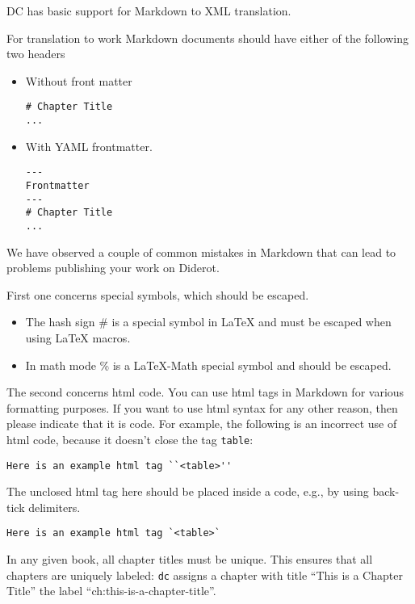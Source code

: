 DC has basic support for Markdown to XML translation.  

\begin{gram}[Header]
For translation to work Markdown documents should have either of the following two headers
\begin{itemize}
\item Without front matter
\begin{lstlisting}
# Chapter Title
...
\end{lstlisting}  

\item  With YAML frontmatter.
\begin{lstlisting}
--- 
Frontmatter
---
# Chapter Title
...
\end{lstlisting}  
\end{itemize}
\end{gram}

\begin{important}
We have observed a couple of common mistakes in Markdown that can lead to problems publishing your work on Diderot.

First one concerns special symbols, which should be escaped.
\begin{itemize}
\item The hash sign \# is a special symbol in LaTeX and must be escaped when using LaTeX macros.
\item In math mode \% is a LaTeX-Math special symbol and should be escaped.
\end{itemize}

The second concerns html code.  You can use html tags in Markdown for various formatting purposes.  If you want to use html syntax for  any other reason, then please indicate that it is code.  For example, the following is an incorrect use of html code, because it doesn't close the tag \lstinline`table`:
\begin{lstlisting}
Here is an example html tag ``<table>''
\end{lstlisting}

The unclosed html tag here should be placed inside a code, e.g., by using back-tick delimiters. 
\begin{lstlisting}
Here is an example html tag `<table>`
\end{lstlisting}

\end{important}

\begin{important}
In any given book, all chapter titles must be unique.  
%
This ensures that all chapters are uniquely labeled: \lstinline`dc` assigns a chapter with title ``This is a Chapter Title'' the label ``ch:this-is-a-chapter-title''.
\end{important}


